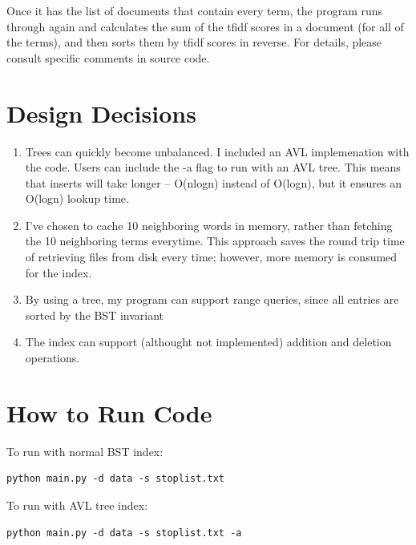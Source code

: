 \documentclass[11pt]{article}
\begin{document}
\noindent
Once it has the list of documents that contain every term, the program runs through again and calculates the sum of the tfidf scores in a document (for all of the terms), and then sorts them by tfidf scores in reverse. For details, please consult specific comments in source code.
\section*{Design Decisions}
\begin{enumerate}
\item Trees can quickly become unbalanced. I included an AVL implemenation with the code. Users can include the -a flag to run with an AVL tree. This means that inserts will take longer -- O(nlogn) instead of O(logn), but it ensures an O(logn) lookup time.
\item I've chosen to cache 10 neighboring words in memory, rather than fetching the 10 neighboring terms everytime. This approach saves the round trip time of retrieving files from disk every time; however, more memory is consumed for the index.
\item By using a tree, my program can support range queries, since all entries are sorted by the BST invariant
\item The index can support (althought not implemented) addition and deletion operations. 
\end{enumerate}
\section*{How to Run Code}
To run with normal BST index:
\begin{Verbatim}[frame=single]
python main.py -d data -s stoplist.txt
\end{Verbatim}
To run with AVL tree index:
\begin{Verbatim}[frame=single]
python main.py -d data -s stoplist.txt -a
\end{Verbatim}
\end{document}
